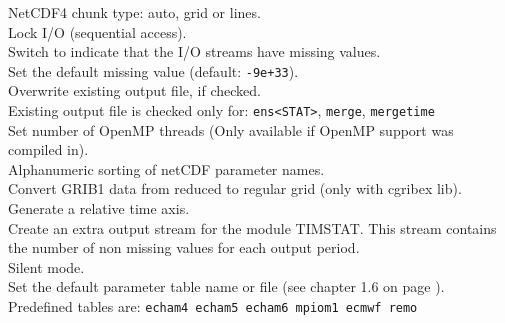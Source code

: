 \begin{tabbing}
         \> NetCDF4 chunk type: auto, grid or lines. \\
         \> Lock I/O (sequential access). \\
         \> Switch to indicate that the I/O streams have missing values. \\
         \> Set the default missing value (default: {\tt-9e+33}). \\
         \> Overwrite existing output file, if checked. \\
         \> Existing output file is checked only for: {\tt ens<STAT>}, {\tt merge}, {\tt mergetime} \\
         \> Set number of OpenMP threads (Only available if OpenMP support was compiled in). \\
         \> Alphanumeric sorting of netCDF parameter names. \\
         \> Convert GRIB1 data from reduced to regular grid (only with cgribex lib). \\
         \> Generate a relative time axis. \\
         \> Create an extra output stream for the module TIMSTAT. This stream contains  \\
         \> the number of non missing values for each output period. \\
         \> Silent mode. \\
         \> Set the default parameter table name or file (see chapter 1.6 on page \pageref{PARAMETER_TABLE}).\\
         \> Predefined tables are:  {\tt echam4 echam5 echam6 mpiom1 ecmwf remo}\\

\end{tabbing}
